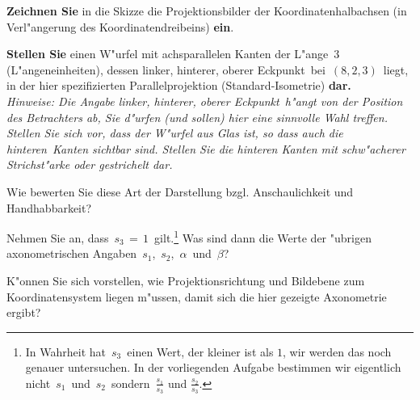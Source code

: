 \begin{Aufgabe}
\begin{center}
\end{center}
\enlargethispage{3ex}
\small
\begin{Teilaufgaben}
\setlength{\itemsep}{-0.5ex}
\item \textbf{Zeichnen Sie} in die Skizze die Projektionsbilder der Koordinatenhalbachsen (in Verl"angerung des Koordinatendreibeins) \textbf{ein}.
\item \textbf{Stellen Sie} einen W"urfel mit achsparallelen Kanten der L"ange\, $3$\, (L"angeneinheiten),
 dessen \glqq linker, hinterer, oberer Eckpunkt\grqq\ bei \,$(8,2,3)$\, liegt, in der hier spezifizierten Parallelprojektion (Standard-Isometrie) \textbf{dar.}
 \\[0.5ex]
{\footnotesize \textit{Hinweise:  Die Angabe \glqq linker, hinterer, oberer Eckpunkt\grqq\ h"angt von der Position des Betrachters ab, Sie d"urfen (und sollen) hier eine sinnvolle Wahl treffen. Stellen Sie sich vor, dass der W"urfel aus Glas ist, so dass auch die \glqq hinteren\grqq\ Kanten sichtbar sind. Stellen Sie die hinteren Kanten mit schw"acherer Strichst"arke oder gestrichelt dar.}}
\item Wie bewerten Sie diese Art der Darstellung bzgl. Anschaulichkeit und Handhabbarkeit?
\item Nehmen Sie an, dass\, $s_3 \,=\, 1$\, gilt.\footnote{In Wahrheit hat\, $s_3$\, einen Wert, der kleiner ist als $1$, wir werden das noch genauer untersuchen. In der vorliegenden Aufgabe bestimmen wir eigentlich nicht\, $s_1$\, und\, $s_2$\, sondern\,  $\tfrac{s_1}{s_3}$ und $\tfrac{s_2}{s_3}$.} Was sind dann die Werte der "ubrigen axonometrischen Angaben\, $s_1$,\, $s_2$,\, $\alpha$\, und \,$\beta$?
\item K"onnen Sie sich vorstellen, wie Projektionsrichtung und Bildebene zum Koordinatensystem liegen m"ussen, damit sich die hier gezeigte Axonometrie ergibt?
\end{Teilaufgaben}
\end{Aufgabe}
